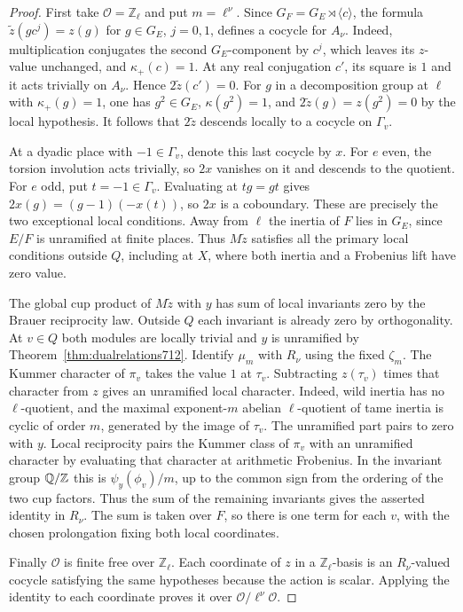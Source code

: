 \documentclass[a4paper,11pt]{article}
\theoremstyle{definition}
\theoremstyle{remark}
\newcommand{\ZZ}{\mathbb Z}\newcommand{\ord}{\operatorname{ord}}
\numberwithin{equation}{section}
\begin{document}
\begin{proof}
First take \(\mathcal O=\ZZ_\ell\) and put \(m=\ell^\nu\).
Since \(G_F=G_E\rtimes\langle c\rangle\), the formula
\(\widetilde z(gc^j)=z(g)\) for \(g\in G_E\), \(j=0,1\),
defines a cocycle for \(A_\nu\). Indeed, multiplication
conjugates the second \(G_E\)-component by \(c^j\), which
leaves its \(z\)-value unchanged, and \(\kappa_+(c)=1\).
At any real conjugation \(c'\), its square is \(1\) and it
acts trivially on \(A_\nu\). Hence \(2\widetilde z(c')=0\).
For \(g\) in a decomposition group at \(\ell\) with
\(\kappa_+(g)=1\), one has \(g^2\in G_E\), \(\kappa(g^2)=1\),
and \(2\widetilde z(g)=z(g^2)=0\) by the local hypothesis.
It follows that \(2\widetilde z\) descends locally to a
cocycle on \(\Gamma_v\).

At a dyadic place with \(-1\in\Gamma_v\), denote this last
cocycle by \(x\). For \(e\) even, the torsion involution acts
trivially, so \(2x\) vanishes on it and descends to the
quotient. For \(e\) odd, put \(t=-1\in\Gamma_v\). Evaluating
at \(tg=gt\) gives \(2x(g)=(g-1)(-x(t))\), so \(2x\) is
a coboundary. These are precisely the two exceptional local
conditions. Away from \(\ell\) the inertia of \(F\) lies in
\(G_E\), since \(E/F\) is unramified at finite places. Thus
\(M\widetilde z\) satisfies all the primary local conditions
outside \(Q\), including at \(X\), where both inertia and
a Frobenius lift have zero value.

The global cup product of \(M\widetilde z\) with \(y\) has
sum of local invariants zero by the Brauer reciprocity law.
Outside \(Q\) each invariant is already zero by orthogonality.
At \(v\in Q\) both modules are locally trivial and \(y\) is
unramified by Theorem~\ref{thm:dualrelations712}. Identify
\(\mu_m\) with \(R_\nu\) using the fixed \(\zeta_m\). The
Kummer character of \(\pi_v\) takes the value \(1\) at
\(\tau_v\). Subtracting \(z(\tau_v)\) times that character
from \(z\) gives an unramified local character. Indeed,
wild inertia has no \(\ell\)-quotient, and the maximal
exponent-\(m\) abelian \(\ell\)-quotient of tame inertia is
cyclic of order \(m\), generated by the image of \(\tau_v\).
The unramified part pairs to zero with \(y\). Local reciprocity
pairs the Kummer class of \(\pi_v\) with an unramified character
by evaluating that character at arithmetic Frobenius. In the
invariant group \(\QQ/\ZZ\) this is \(\psi_y(\phi_v)/m\), up
to the common sign from the ordering of the two cup factors.
Thus the sum of the remaining invariants gives the asserted
identity in \(R_\nu\). The sum is taken over \(F\), so there
is one term for each \(v\), with the chosen prolongation fixing
both local coordinates.~\cite{II-II-II-duality13}

Finally \(\mathcal O\) is finite free over \(\ZZ_\ell\).
Each coordinate of \(z\) in a \(\ZZ_\ell\)-basis is an
\(R_\nu\)-valued cocycle satisfying the same hypotheses because
the action is scalar. Applying the identity to each coordinate
proves it over \(\mathcal O/\ell^\nu\mathcal O\).
\end{proof}
\end{document}

